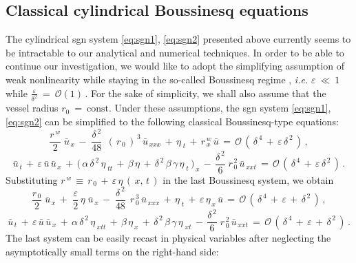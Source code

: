 \documentclass[alpha-refs, 12pt]{wiley-article}
\renewcommand{\O}{\mathcal{O}}
\newcommand{\eps}{\varepsilon}
\begin{document}
\subsection{Classical cylindrical Boussinesq equations}

The cylindrical \acrshort{sgn} system \eqref{eq:sgn1}, \eqref{eq:sgn2} presented above currently seems to be intractable to our analytical and numerical techniques. In order to be able to continue our investigation, we would like to adopt the simplifying assumption of weak nonlinearity while staying in the so-called Boussinesq regime \citep{DMII, Dutykh2014f, Dutykh2007, DMS1}, \emph{i.e.} $\eps\ \ll\ 1$ while $\frac{\eps}{\delta^2}\ =\ \O(1)\,$. For the sake of simplicity, we shall also assume that the vessel radius $r_0\ =\ \mathrm{const}$. Under these assumptions, the \acrshort{sgn} system \eqref{eq:sgn1}, \eqref{eq:sgn2} can be simplified to the following classical Boussinesq-type equations:
\begin{equation}\label{eq:5.1}
  \frac{r^{\,w}}{2}\;\bar{u}_{\,x}\,-\;\frac{\delta^{\,2}}{48}\;\,(\,r_{\,0}\,)^{\,3}\,\bar{u}_{\,xxx}\,+\,\eta_{\;t}\,+\,r^{\,w}_{\,x}\,\bar{u}\,=\,\O\,(\,\delta^{\,4}\,+\,\eps\,\delta^{\,2}\,)\,,
\end{equation}
\begin{equation}\label{eq:5.2}
  \bar{u}_{\,t}\, + \,\eps\,\bar{u}\,\bar{u}_{\,x}\, + \,\bigl(\,\alpha\,\delta^{\,2}\,\eta_{\;tt}\, + \,\beta\,\eta\, + \,\delta^{\,2}\,\beta\,\gamma\,\eta_{\;t}\,\bigr)_{\,x}\, - \,\frac{\delta^{\,2}}{6}\;r_{\,0}^{\,2}\,\bar{u}_{\,xxt}\, =\, \O\,(\,\delta^{\,4}\,+\,\eps\,\delta^{\,2}\,)\,.
\end{equation}
Substituting $r^{\,w}\,\equiv\, r_{\,0}\,+\,\eps\,\eta\,(\,x,\,t\,)$ in the last Boussinesq system, we obtain
\begin{equation*}
  \frac{r_{\,0}}{2}\;\bar{u}_{\,x}\, + \,\,\frac{\eps}{2}\,\eta\;\bar{u}_{\,x}\, -\;\frac{\delta^{\,2}}{48}\;\,r_{\,0}^{\,3}\,\bar{u}_{\,xxx}\, + \,\eta_{\;t}\, + \,\eps\,\eta_{\,x}\,\bar{u}\, = \,\O\,(\,\delta^{\,4}\,+\,\eps\,+\,\delta^{\,2}\,)\,,
\end{equation*}
\begin{equation*}
  \bar{u}_{\,t}\, + \,\eps\,\bar{u}\,\bar{u}_{\,x}\, + \,\alpha\,\delta^{\,2}\,\eta_{\;xtt}\, + \,\beta\,\eta_{\,x}\, + \,\delta^{\,2}\,\beta\,\gamma\,\eta_{\;xt}\, - \,\frac{\delta^{\,2}}{6}\;r_{\,0}^{\,2}\,\bar{u}_{\,xxt}\, = \,\O\,(\,\delta^{\,4}\,+\,\eps\,+\,\delta^{\,2}\,)\,.
\end{equation*}
The last system can be easily recast in physical variables after neglecting the asymptotically small terms on the right-hand side:
\end{document}
